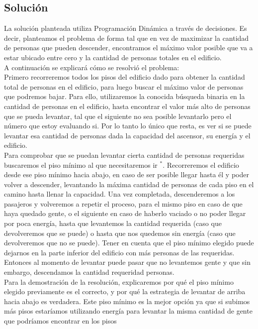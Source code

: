 \subsection{Soluci\'on}
La solución planteada utiliza Programación Dinámica a través de decisiones. Es decir, planteamos el problema de forma tal que en vez de maximizar la cantidad de personas que 
pueden descender, encontramos el máximo valor posible que va a estar ubicado entre cero y la cantidad de personas totales en el edificio.\\
A continuación se explicará cómo se resolvió el problema:\\
Primero recorreremos todos los pisos del edificio dado para obtener la cantidad total de personas en el edificio, para luego buscar el máximo valor de personas que podremos bajar.
Para ello, utilizaremos la conocida búsqueda binaria en la cantidad de personas en el edificio, hasta encontrar el valor más alto de personas que se pueda levantar, tal que el siguiente no sea posible levantarlo pero el número que estoy evaluando si.
Por lo tanto lo único que resta, es ver si se puede levantar esa cantidad de personas dada la capacidad del ascensor, su energía y el edificio. \\
Para comprobar que se puedan levantar cierta cantidad de personas requeridas buscaremos el piso mínimo al que necesitaremos ir $^*$. Recorreremos el edificio desde ese piso mínimo hacia abajo, en caso de ser posible llegar hasta él y poder volver a descender, levantando la máxima cantidad de personas de cada piso en el camino hasta llenar la capacidad. Una vez completada, descenderemos a los pasajeros y volveremos a repetir el proceso,
para el mismo piso en caso de que haya quedado gente, o el siguiente en caso de haberlo vaciado o no poder llegar por poca energía, hasta que levantemos la cantidad requerida (caso que devolveremos que se puede) o hasta que nos quedemos sin energía (caso que devolveremos que no se puede). Tener en cuenta que el piso mínimo elegido puede dejarnos en la parte inferior del edificio con más personas de las requeridas. Entonces al momento de levantar puede pasar que no levantemos gente y que sin embargo, descendamos la cantidad requeridad personas.\\
Para la demostración de la resolución, explicaremos por qué el piso mínimo elegido previamente es el correcto, y por qué la estrategia de levantar de arriba hacia abajo es verdadera.
Este piso mínimo es la mejor opción ya que si subimos más pisos estaríamos utilizando energía para levantar la misma cantidad de gente que podríamos encontrar en los pisos

